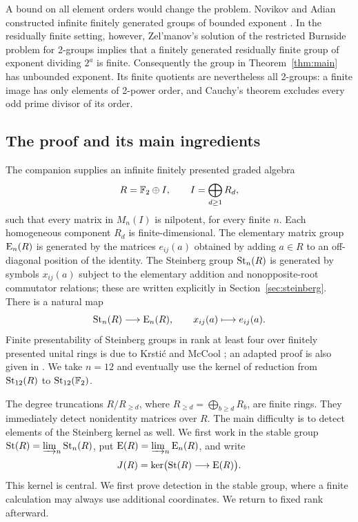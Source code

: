 A bound on all element orders would change the problem. Novikov and
Adian constructed infinite finitely generated groups of bounded exponent
\cite{NovikovAdian1968}. In the residually finite setting, however,
Zel'manov's solution of the restricted Burnside problem for 2-groups
\cite[Theorem~2]{Zelmanov1992} implies that a finitely generated
residually finite group of exponent dividing $2^a$ is finite.
Consequently the group in Theorem~\ref{thm:main} has unbounded
exponent. Its finite quotients are nevertheless all 2-groups: a finite
image has only elements of 2-power order, and Cauchy's theorem excludes
every odd prime divisor of its order.

\subsection*{The proof and its main ingredients}

The companion supplies an infinite finitely presented graded algebra
\[
 R=\mathbb F_2\oplus I,\qquad I=\bigoplus_{d\ge1}R_d,
\]
such that every matrix in $M_n(I)$ is nilpotent, for every finite $n$.
Each homogeneous component $R_d$ is finite-dimensional. The elementary
matrix group $\operatorname{E}_n(R)$ is generated by the matrices $e_{ij}(a)$ obtained
by adding $a\in R$ to an off-diagonal position of the identity.
The Steinberg group $\operatorname{St}_n(R)$ is generated by symbols $x_{ij}(a)$
subject to the elementary addition and nonopposite-root commutator
relations; these are written explicitly in
Section~\ref{sec:steinberg}. There is a natural map
\[
 \operatorname{St}_n(R)\longrightarrow\operatorname{E}_n(R),\qquad
 x_{ij}(a)\longmapsto e_{ij}(a).
\]
Finite presentability of Steinberg groups in rank at least four over
finitely presented unital rings is due to Krsti\'c and McCool
\cite[Theorem~3]{KrsticMcCool}; an adapted proof is also given in
\cite[Theorem~4.1]{Companion}. We take $n=12$ and eventually use
the kernel of reduction from $\operatorname{St}_{12}(R)$ to $\operatorname{St}_{12}(\mathbb F_2)$.

The degree truncations $R/R_{\ge d}$, where
$R_{\ge d}=\bigoplus_{b\ge d}R_b$, are finite rings. They immediately
detect nonidentity matrices over $R$. The main difficulty is to detect
elements of the Steinberg kernel as well. We first work in the stable
group $\operatorname{St}(R)=\varinjlim_n\operatorname{St}_n(R)$, put
$\operatorname{E}(R)=\varinjlim_n\operatorname{E}_n(R)$, and write
\[
 J(R)=\ker\bigl(\operatorname{St}(R)\longrightarrow\operatorname{E}(R)\bigr).
\]
This kernel is central. We first prove detection in the stable group,
where a finite calculation may always use additional coordinates.
We return to fixed rank afterward.

